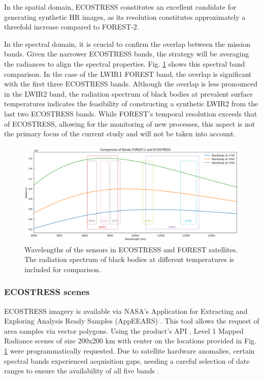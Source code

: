 In the spatial domain, ECOSTRESS constitutes an excellent candidate for generating synthetic HR images, as its resolution constitutes approximately a threefold increase compared to FOREST-2. 

In the spectral domain, it is crucial to confirm the overlap between the mission bands. Given the narrower ECOSTRESS bands, the strategy will be averaging the radiances to align the spectral properties.
Fig. \ref{fig:5-wavelength-comparison} shows this spectral band comparison.
In the case of the LWIR1 FOREST band, the overlap is significant with the first three ECOSTRESS bands.
Although the overlap is less pronounced in the LWIR2 band, the radiation spectrum of black bodies at prevalent surface temperatures indicates the feasibility of constructing a synthetic LWIR2 from the last two ECOSTRESS bands. While FOREST's temporal resolution exceeds that of ECOSTRESS, allowing for the monitoring of new processes, this aspect is not the primary focus of the current study and will not be taken into account.



\begin{figure}[H]
    \centering
    \includegraphics[width=\linewidth]{Includes/5-wavelength-comparison.png}
    \caption{Wavelengths of the sensors in ECOSTRESS and FOREST satellites. The radiation spectrum of black bodies at different temperatures is included for comparison.}
    \label{fig:5-wavelength-comparison}
\end{figure}

\subsubsection{ECOSTRESS scenes}
    ECOSTRESS imagery is available via NASA's Application for Extracting and Exploring Analysis Ready Samples (AppEEARS) \cite{AppEEARS2023}. This tool allows the request of area samples via vector polygons. Using the product's API \cite{AppEEARSAPI2023}, Level 1 Mapped Radiance scenes of size 200x200 km with center on the locations provided in Fig. \ref{fig:5-wavelength-comparison} were programmatically requested. Due to satellite hardware anomalies, certain spectral bands experienced acquisition gaps, needing a careful selection of date ranges to ensure the availability of all five bands \cite{ECO1BMAPRAD2023}.

